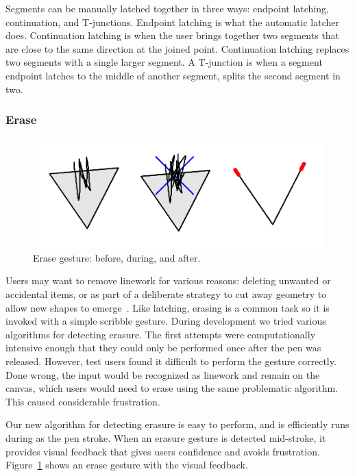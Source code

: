 \documentclass{article}
\begin{document}
Segments can be manually latched together in three ways: endpoint
latching, continuation, and T-junctions. Endpoint latching is what the
automatic latcher does. Continuation latching is when the user brings
together two segments that are close to the same direction at the
joined point. Continuation latching replaces two segments with a
single larger segment. A T-junction is when a segment endpoint latches
to the middle of another segment, splits the second segment in two.

\subsubsection{Erase}

\begin{figure}[h]
  \centering
  \includegraphics[width=0.9\linewidth]{img/erase-all.pdf}
  \caption{Erase gesture: before, during, and after.}
  \label{fig:erase}
\end{figure}

Users may want to remove linework for various reasons: deleting
unwanted or accidental items, or as part of a deliberate strategy to
cut away geometry to allow new shapes to
emerge~\cite{zeleznik-lineogrammer}. Like latching, erasing is a
common task so it is invoked with a simple scribble gesture. During
development we tried various algorithms for detecting erasure. The
first attempts were computationally intensive enough that they could
only be performed once after the pen was released. However, test users
found it difficult to perform the gesture correctly. Done wrong, the
input would be recognized as linework and remain on the canvas, which
users would need to erase using the same problematic algorithm. This
caused considerable frustration.

Our new algorithm for detecting erasure is easy to perform, and is
efficiently runs during as the pen stroke. When an erasure gesture is
detected mid-stroke, it provides visual feedback that gives users
confidence and avoids frustration. Figure~\ref{fig:erase} shows an
erase gesture with the visual feedback.
\end{document}

